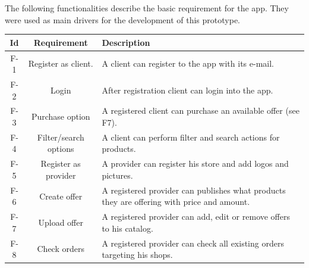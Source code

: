The following functionalities describe the basic requirement for the \gls{app}. They were used as main drivers
for the development of this prototype.

    \begin{tabularx}{\textwidth}{ccX}
    \toprule
    Id & Requirement & Description  \\
    \midrule
    F-1 & Register as \gls{client}. & A \gls{client} can register to the app with its e-mail.\\
    F-2 & Login & After registration \gls{client} can login into the app. \\
    F-3 & Purchase option & A registered \gls{client} can purchase an available offer (see F7).\\
    F-4 & Filter/search options & A \gls{client} can perform filter and search actions for products.\\
    F-5 & Register as \gls{provider} & A \gls{provider} can register his store and add logos and pictures.\\
    F-6 & Create offer & A registered \gls{provider} can publishes what products they are offering with price 
    and amount. \\
    F-7 & Upload offer & A registered \gls{provider} can add, edit or remove offers to his catalog.\\
    F-8 & Check orders & A registered \gls{provider} can check all existing orders targeting his shops.\\
    \bottomrule
    \end{tabularx}

